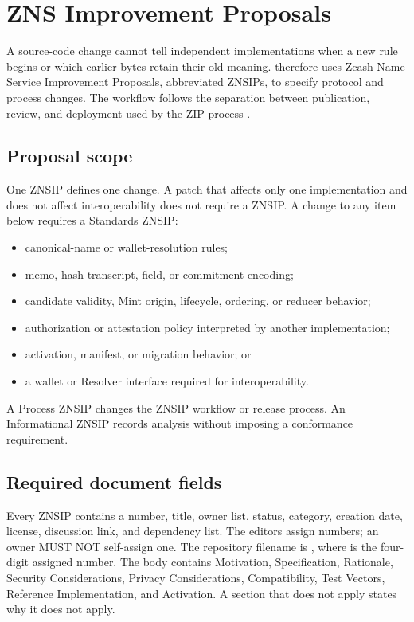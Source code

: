 \section{ZNS Improvement Proposals}
\label{sec:znsips}

A source-code change cannot tell independent implementations when a new rule begins or which earlier bytes retain their old meaning.
\zns{} therefore uses Zcash Name Service Improvement Proposals, abbreviated ZNSIPs, to specify protocol and process changes.
The workflow follows the separation between publication, review, and deployment used by the ZIP process \cite{zip0}.

\subsection{Proposal scope}

One ZNSIP defines one change.
A patch that affects only one implementation and does not affect interoperability does not require a ZNSIP.
A change to any item below requires a Standards ZNSIP:

\begin{itemize}
  \item canonical-name or wallet-resolution rules;
  \item memo, hash-transcript, field, or commitment encoding;
  \item candidate validity, Mint origin, lifecycle, ordering, or reducer behavior;
  \item authorization or attestation policy interpreted by another implementation;
  \item activation, manifest, or migration behavior; or
  \item a wallet or Resolver interface required for interoperability.
\end{itemize}

A Process ZNSIP changes the ZNSIP workflow or release process.
An Informational ZNSIP records analysis without imposing a conformance requirement.

\subsection{Required document fields}

Every ZNSIP contains a number, title, owner list, status, category, creation date, license, discussion link, and dependency list.
The editors assign numbers; an owner MUST NOT self-assign one.
The repository filename is , where  is the four-digit assigned number.
The body contains Motivation, Specification, Rationale, Security Considerations, Privacy Considerations, Compatibility, Test Vectors, Reference Implementation, and Activation.
A section that does not apply states why it does not apply.

